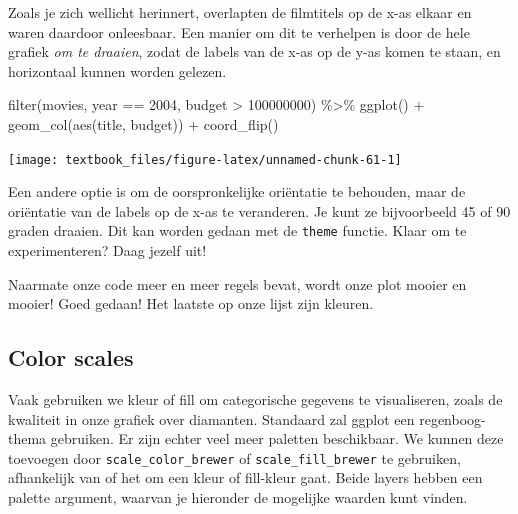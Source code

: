 \documentclass[]{tufte-book}
\newenvironment{Shaded}{}{}
\newcommand{\DecValTok}[1]{\textcolor[rgb]{0.25,0.63,0.44}{#1}}
\newcommand{\FunctionTok}[1]{\textcolor[rgb]{0.02,0.16,0.49}{#1}}
\newcommand{\NormalTok}[1]{#1}
\newcommand{\SpecialCharTok}[1]{\textcolor[rgb]{0.25,0.44,0.63}{#1}}
\begin{document}
Zoals je zich wellicht herinnert, overlapten de filmtitels op de x-as elkaar en waren daardoor onleesbaar. Een manier om dit te verhelpen is door de hele grafiek \emph{om te draaien}, zodat de labels van de x-as op de y-as komen te staan, en horizontaal kunnen worden gelezen.

\begin{Shaded}
\begin{Highlighting}[]
\FunctionTok{filter}\NormalTok{(movies, year }\SpecialCharTok{==} \DecValTok{2004}\NormalTok{, budget }\SpecialCharTok{\textgreater{}} \DecValTok{100000000}\NormalTok{) }\SpecialCharTok{\%\textgreater{}\%}
  \FunctionTok{ggplot}\NormalTok{() }\SpecialCharTok{+}
  \FunctionTok{geom\_col}\NormalTok{(}\FunctionTok{aes}\NormalTok{(title, budget)) }\SpecialCharTok{+}
  \FunctionTok{coord\_flip}\NormalTok{()}
\end{Highlighting}
\end{Shaded}

\texttt{[image: textbook\_files/figure-latex/unnamed-chunk-61-1]}

Een andere optie is om de oorspronkelijke oriëntatie te behouden, maar de oriëntatie van de labels op de x-as te veranderen. Je kunt ze bijvoorbeeld 45 of 90 graden draaien. Dit kan worden gedaan met de \texttt{theme} functie. Klaar om te experimenteren? Daag jezelf uit!

Naarmate onze code meer en meer regels bevat, wordt onze plot mooier en mooier! Goed gedaan! Het laatste op onze lijst zijn kleuren.

\hypertarget{color-scales}{%
\subsection{Color scales}\label{color-scales}}

Vaak gebruiken we kleur of fill om categorische gegevens te visualiseren, zoals de kwaliteit in onze grafiek over diamanten. Standaard zal ggplot een regenboog-thema gebruiken. Er zijn echter veel meer paletten beschikbaar. We kunnen deze toevoegen door \texttt{scale\_color\_brewer} of \texttt{scale\_fill\_brewer} te gebruiken, afhankelijk van of het om een kleur of fill-kleur gaat. Beide layers hebben een palette argument, waarvan je hieronder de mogelijke waarden kunt vinden.
\end{document}
